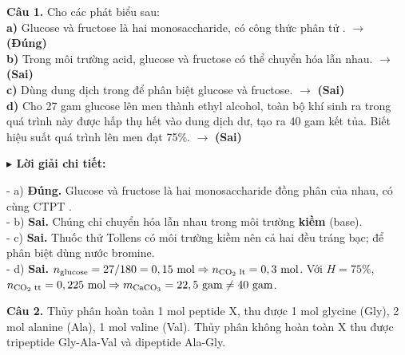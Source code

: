 \documentclass[11pt,a4paper]{article}
\newcommand{\loigiai}[1]{
    \par\vspace{2pt}
    \begingroup\leftskip=12pt
    \textcolor{solBlue}{\textbf{$\blacktriangleright$ Lời giải chi tiết:}}\par
    \small #1
    \par\endgroup\vspace{3pt}
}
\begin{document}
\textbf{Câu 1.} Cho các phát biểu sau:\\[2pt]
\quad \textbf{a)} Glucose và fructose là hai monosaccharide, có công thức phân tử . \quad $\to$ \textbf{\color{ansRed}(Đúng)}\\[2pt]
\quad \textbf{b)} Trong môi trường acid, glucose và fructose có thể chuyển hóa lẫn nhau. \quad $\to$ \textbf{\color{ansRed}(Sai)}\\[2pt]
\quad \textbf{c)} Dùng dung dịch  trong  để phân biệt glucose và fructose. \quad $\to$ \textbf{\color{ansRed}(Sai)}\\[2pt]
\quad \textbf{d)} Cho 27 gam glucose lên men thành ethyl alcohol, toàn bộ khí  sinh ra trong quá trình này được hấp thụ hết vào dung dịch  dư, tạo ra 40 gam kết tủa. Biết hiệu suất quá trình lên men đạt 75\%. \quad $\to$ \textbf{\color{ansRed}(Sai)}\\[2pt]
\loigiai{- a) \textbf{Đúng.} Glucose và fructose là hai monosaccharide đồng phân của nhau, có cùng CTPT \ce{C6H12O6}.\\
- b) \textbf{Sai.} Chúng chỉ chuyển hóa lẫn nhau trong môi trường \textbf{kiềm} (base).\\
- c) \textbf{Sai.} Thuốc thử Tollens có môi trường kiềm nên cả hai đều tráng bạc; để phân biệt dùng nước bromine.\\
- d) \textbf{Sai.} $n_{\text{glucose}} = 27 / 180 = 0,15\text{ mol} \Rightarrow n_{\ce{CO2}\text{ lt}} = 0,3\text{ mol}$. Với $H = 75\%$, $n_{\ce{CO2}\text{ tt}} = 0,225\text{ mol} \Rightarrow m_{\ce{CaCO3}} = 22,5\text{ gam} \neq 40\text{ gam}$.}
\vspace{4pt}
\textbf{Câu 2.} Thủy phân hoàn toàn 1 mol peptide X, thu được 1 mol glycine (Gly), 2 mol alanine (Ala), 1 mol valine (Val). Thủy phân không hoàn toàn X thu được tripeptide Gly-Ala-Val và dipeptide Ala-Gly.\\[2pt]
\end{document}
